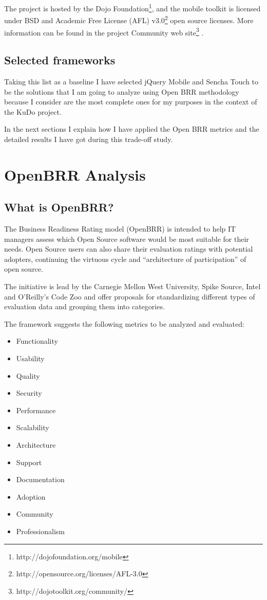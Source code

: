 \documentclass[a4paper,12pt]{book}
\begin{document}
The project is hosted by the Dojo Foundation\footnote{http://dojofoundation.org/mobile}, and the mobile toolkit is licensed under BSD and Academic Free License (AFL) v3.0\footnote{http://opensource.org/licenses/AFL-3.0} open source licenses. More information can be found in the project Community web site\footnote{http://dojotoolkit.org/community/} .

\section{Selected frameworks}
\label{sec:selected}
Taking this list as a baseline I have selected jQuery Mobile and Sencha Touch to be the solutions that I am going to analyze using Open BRR methodology because I consider are the most complete ones for my purposes in the context of the KuDo project.

In the next sections I explain how I have applied the Open BRR metrics and the detailed results I have got during this trade-off study.


\chapter{OpenBRR Analysis}
\label{chap:openbrr}

\section{What is OpenBRR?}
\label{sec:openbrr2}

The Business Readiness Rating model (OpenBRR)\cite{OpenBRRWhitepaper} is
intended to help IT managers assess which Open Source software would be most suitable for their needs. Open Source users can also share their evaluation ratings with potential adopters, continuing the virtuous cycle and “architecture of participation” of open
source.

The initiative\cite{The OpenBRR Corporate Community}  is lead by the Carnegie Mellon West University, Spike Source, Intel and O’Reilly’s Code Zoo and offer proposals for standardizing different types of evaluation data and grouping them into categories.

The framework suggests the following metrics to be analyzed and evaluated:
\begin{itemize}
\item Functionality
\item Usability
\item Quality
\item Security
\item Performance
\item Scalability
\item Architecture
\item Support
\item Documentation
\item Adoption
\item Community
\item Professionalism
\end{itemize}
\end{document}
